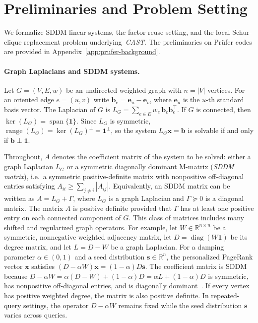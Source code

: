 \documentclass{article}
\newcommand{\CAST}{\textit{CAST}\xspace}
\newcommand{\1}{\mathbbm{1}}
\theoremstyle{plain}
\begin{document}
\section{Preliminaries and Problem Setting}
\label{sec:preliminaries}
We formalize SDDM linear systems, the factor-reuse
setting, and the local Schur-clique replacement problem underlying~\CAST. The preliminaries on Pr\"ufer codes are provided in Appendix~\ref{app:prufer-background}.

\paragraph{\textbf{Graph Laplacians and SDDM systems}.}

Let $G=(V,E,w)$ be an undirected weighted graph with $n=|V|$ vertices. For an oriented edge $e=(u,v)$ write $\mathbf{b}_e=\mathbf{e}_u-\mathbf{e}_v$, where $\mathbf{e}_u$ is the $u$-th standard basis
vector. The Laplacian of $G$ is $L_G=\sum_{e\in E} w_e\, \mathbf{b}_e \mathbf{b}_e^\top$. If $G$ is connected, then $\ker(L_G)=\operatorname{span}\{\mathbf 1\}$.
Since $L_G$ is symmetric,
$\operatorname{range}(L_G)=\ker(L_G)^\perp=\mathbf 1^\perp$, so the system
$L_G\mathbf x=\mathbf b$ is solvable if and only if
$\mathbf b\perp\mathbf 1$. 

Throughout, $A$ denotes the coefficient matrix of the system to be
solved: either a graph Laplacian $L_G$ or a symmetric diagonally
dominant M-matrix (\emph{SDDM matrix}), i.e.\ a symmetric
positive-definite matrix with nonpositive off-diagonal entries
satisfying $A_{ii}\geq\sum_{j\neq i}|A_{ij}|$.
 Equivalently, an SDDM matrix can be written as
$A=L_G+\Gamma$, where $L_G$ is a graph Laplacian and
$\Gamma\succeq 0$ is a diagonal matrix. The matrix $A$ is positive definite
provided that $\Gamma$ has at least one positive entry on each
connected component of $G$. This class of matrices includes many shifted and regularized graph operators.  For example, let \(W \in \mathbb{R}^{n \times n}\) be a symmetric, nonnegative weighted adjacency matrix, let $D = \operatorname{diag}(W\mathbf{1})$ be its degree matrix, and let $L = D-W$ be a graph Laplacian. For a damping parameter $\alpha \in (0,1)$ and a seed distribution $\mathbf{s} \in \mathbb{R}^{n}$, the personalized PageRank vector \(\mathbf{x}\) satisfies $(D-\alpha W)\mathbf{x}=(1-\alpha)D\mathbf{s}$. The coefficient matrix is SDDM because
$D-\alpha W =\alpha(D-W)+(1-\alpha)D =\alpha L+(1-\alpha)D$  is symmetric, has non\-positive off-diagonal entries, and is diagonally dominant~\cite{gleich2015pagerank}. If every vertex has positive weighted degree, the matrix is also positive definite. In repeated-query settings, the operator $D-\alpha W$ remains fixed while the seed distribution $\mathbf{s}$ varies across queries.
\end{document}
